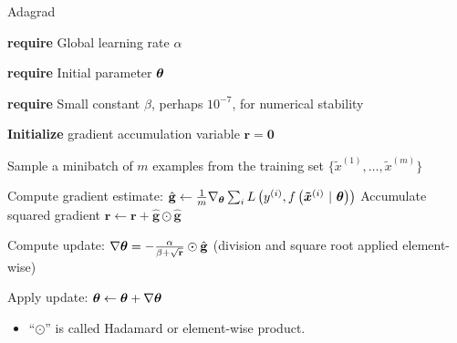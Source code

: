 \documentclass[11pt,compress,t,notes=noshow, xcolor=table]{beamer}
\begin{document}
\begin{vbframe}{Adagrad}
	
	\begin{algorithm}[H]
		\small
		\caption{Adagrad}
		\begin{algorithmic}[1]
			\scriptsize 
			\State \textbf{require} Global learning rate $\alpha$ \strut
			\State \textbf{require} Initial parameter $\bm{\theta}$ \strut
			\State \textbf{require} Small constant $\beta$, perhaps $10^{-7}$, for numerical stability \strut
			\State \textbf{Initialize} gradient accumulation variable $\mathbf{r} = \mathbf{0} $
			\State \parbox[t]{\dimexpr\linewidth-\algorithmicindent}{Sample a minibatch of $m$ examples from the training set $\{\tilde{x}^{(1)},\dots,\tilde{x}^{(m)}\}$ \strut}
			\State Compute gradient estimate: $\hat{\mathbf{g}} \leftarrow \frac{1}{m} \nabla_{\bm{\theta}} \sum_{i} L\left(y^{(i)}, f\left(\bm{\tilde{x}}^{(i)} ~|~ \bm{\theta}\right)\right)$
			\State Accumulate squared gradient $\mathbf{r} \leftarrow \mathbf{r} + \hat{\mathbf{g}} \odot  \hat{\mathbf{g}}$
			\State \parbox[t]{\dimexpr\linewidth-\algorithmicindent}{Compute update: $\nabla \bm{\theta} = - \frac{\alpha}{\beta + \sqrt\mathbf{r}} \odot \hat{\mathbf{g}}$ (division and square root applied element-wise) \strut}
			\State Apply update: $\bm{\theta} \leftarrow \bm{\theta} + \nabla\bm{\theta}$
			\EndWhile
		\end{algorithmic}
	\end{algorithm}
	\begin{itemize}
		\small
		\item \enquote{$\odot$} is called Hadamard or element-wise product.
	\end{itemize}
\end{vbframe}

\end{document}
